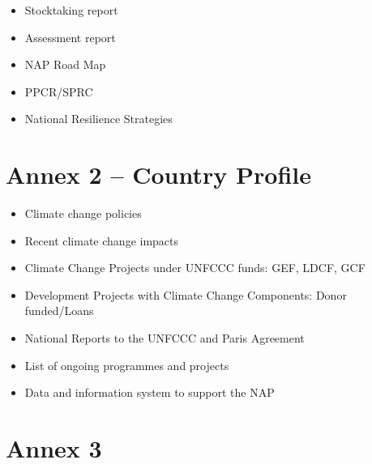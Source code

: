\documentclass[
]{book}
\providecommand{\tightlist}{%
  \setlength{\itemsep}{0pt}\setlength{\parskip}{0pt}}
\begin{document}
\begin{itemize}
\tightlist
\item
  Stocktaking report
\item
  Assessment report
\item
  NAP Road Map
\item
  PPCR/SPRC
\item
  National Resilience Strategies
\end{itemize}

\hypertarget{annex-2-country-profile}{%
\section{Annex 2 -- Country Profile}\label{annex-2-country-profile}}

\begin{itemize}
\tightlist
\item
  Climate change policies
\item
  Recent climate change impacts
\item
  Climate Change Projects under UNFCCC funds: GEF, LDCF, GCF
\item
  Development Projects with Climate Change Components: Donor funded/Loans
\item
  National Reports to the UNFCCC and Paris Agreement
\item
  List of ongoing programmes and projects
\item
  Data and information system to support the NAP
\end{itemize}

\hypertarget{annex-3}{%
\section{Annex 3}\label{annex-3}}

  
\end{document}
